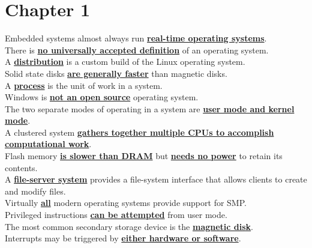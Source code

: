 \documentclass[10pt]{article}
\newcommand{\qw}[1]{\textbf{\ul{#1}}}
\begin{document}
\section*{\centering Chapter 1}
Embedded systems almost always run \qw{real-time operating systems}.\\[2mm]
There is \qw{no universally accepted definition} of an operating system.\\[2mm]
A \qw{distribution} is a custom build of the Linux operating system.\\[2mm]
Solid state disks \qw{are generally faster} than magnetic disks.\\[2mm]
A \qw{process} is the unit of work in a system.\\[2mm]
Windows is \qw{not an open source} operating system.\\[2mm]
The two separate modes of operating in a system are \qw{user mode and kernel mode}.\\[2mm]
A clustered system \qw{gathers together multiple CPUs to accomplish computational work}.\\[2mm]
Flash memory \qw{is slower than DRAM} but \qw{needs no power} to retain its contents.\\[2mm]
A \qw{file-server system} provides a file-system interface that allows clients to create and modify files.\\[2mm]
Virtually \qw{all} modern operating systems provide support for SMP.\\[2mm]
Privileged instructions \qw{can be attempted} from user mode.\\[2mm]
The most common secondary storage device is the \qw{magnetic disk}.\\[2mm]
Interrupts may be triggered by \qw{either hardware or software}.
\end{document}

